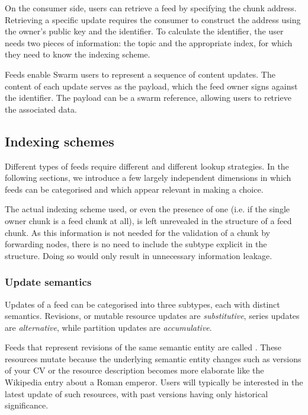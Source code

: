 On the consumer side, users can retrieve a feed by specifying the chunk address. Retrieving a specific update requires the consumer to construct the address using the owner's public key and the identifier. To calculate the identifier, the user needs two pieces of information: the topic and the appropriate index, for which they need to know the indexing scheme. 

Feeds enable Swarm users to represent a sequence of content updates. The content of each update serves as the payload, which the feed owner signs against the identifier. The payload can be a swarm reference, allowing users to retrieve the associated data.

\subsection{Indexing schemes \statusyellow}\label{sec:indexing-schemes}

Different types of feeds require different  and different lookup strategies. In the following sections, we introduce a few largely independent dimensions in which feeds can be categorised and which appear relevant in making a choice.


The actual indexing scheme used, or even the presence of one (i.e. if the single owner chunk is a feed chunk at all), is left unrevealed in the structure of a feed chunk. As this information is not needed for the validation of a chunk by forwarding nodes, there is no need to include the subtype explicit in the structure. Doing so would only result in unnecessary information leakage. 

\subsubsection{Update semantics}

Updates of a feed can be categorised into three subtypes, each with distinct semantics. 
Revisions, or mutable resource updates are \emph{substitutive}, series updates are \emph{alternative}, while partition updates are \emph{accumulative}. 

Feeds that represent revisions of the same semantic entity are called . These resources mutate because the underlying semantic entity changes such as versions of your CV or the resource description becomes more elaborate like the Wikipedia entry about a Roman emperor. Users will typically be interested in the latest update of such resources, with past versions having only historical significance. 

